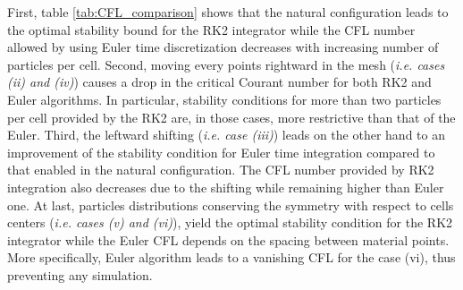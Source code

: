 First, table \ref{tab:CFL_comparison} shows that the natural configuration leads to the optimal stability bound for the RK2 integrator while the CFL number allowed by using Euler time discretization decreases with increasing number of particles per cell.
Second, moving every points rightward in the mesh (\textit{i.e. cases (ii) and (iv)}) causes a drop in the critical Courant number for both RK2 and Euler algorithms. In particular, stability conditions for more than two particles per cell provided by the RK2 are, in those cases, more restrictive than that of the Euler.
Third, the leftward shifting (\textit{i.e. case (iii)}) leads on the other hand to an improvement of the stability condition for Euler time integration compared to that enabled in the natural configuration. The CFL number provided by RK2 integration also decreases due to the shifting while remaining higher than Euler one.
At last, particles distributions conserving the symmetry with respect to cells centers (\textit{i.e. cases (v) and (vi)}), yield the optimal stability condition for the RK2 integrator while the Euler CFL depends on the spacing between material points. More specifically, Euler algorithm leads to a vanishing CFL for the case (vi), thus preventing any simulation.

